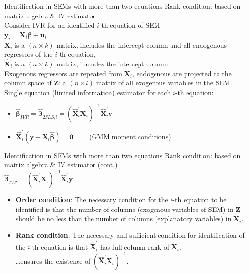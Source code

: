 \documentclass[usenames,dvipsnames]{beamer}
\begin{document}
\begin{frame}{Identification in SEMs with more than two equations}
Rank condition: based on matrix algebra \& IV estimator\\
\medskip
Consider IVR for an identified $i$-th equation of SEM\\
\medskip
$\bm{y}_i = \bm{X}_i \bm{\beta} + \bm{u}_i$\\
\medskip
$\bm{X}_i$ is a $(n\! \times \! k)$ matrix, includes the intercept column and all endogenous regressors of the $i$-th equation,\\
\medskip
$\hat{\bm{X}}_i$ is a $(n\! \times \! k)$ matrix, includes the intercept column.\\
Exogenous regressors are repeated from $\bm{X}_i$, endogenous are projected to the column space of $\bm{Z}$: a $(n\! \times \! l)$ matrix of all exogenous variables in the SEM.\\
\bigskip
Single equation (limited information) estimator for each $i$-th equation:
\begin{itemize}
\medskip
\item $\hat{\bm\beta}_{\textit{IVR}} = \hat{\bm\beta}_{2\textit{SLS,i}}=
\left(\hat{\bm{X}}^{\prime}_i \bm{X}_i \right)^{-1}\! \hat{\bm{X}}^{\prime}_i \bm{y}$\\
\medskip
\item $\hat{\bm{X}}^{\prime}_i \! \left( \bm{y} - \bm{X}_i \hat{\bm{\beta}} \right) = \bm{0} \qquad$ (GMM moment conditions)
\end{itemize}
\end{frame}
\begin{frame}{Identification in SEMs with more than two equations}
Rank condition: based on matrix algebra \& IV estimator (cont.)\\
\medskip
$\hat{\bm\beta}_{\textit{IVR}}=
\left(\hat{\bm{X}}^{\prime}_i \bm{X}_i \right)^{-1}\! \hat{\bm{X}}^{\prime}_i \bm{y}$\\
\bigskip
\begin{itemize}
\item \textbf{Order condition}: The necessary condition for the $i$-th equation to be identified is that the number of columns (exogenous variables of SEM) in $\bm{Z}$ should be no less than the number of columns (explanatory variables) in $\bm{X}_i$.\\
\medskip
\item \textbf{Rank condition}: The necessary and sufficient condition for identification of the $i$-th equation is that $\hat{\bm{X}}^{\prime}_i$ has full column rank of $\bm{X}_i$.\\
\dots ensures the existence of $\left(\hat{\bm{X}}^{\prime}_i \bm{X}_i \right)^{-1}$.
\end{itemize}
\end{frame}
\end{document}
